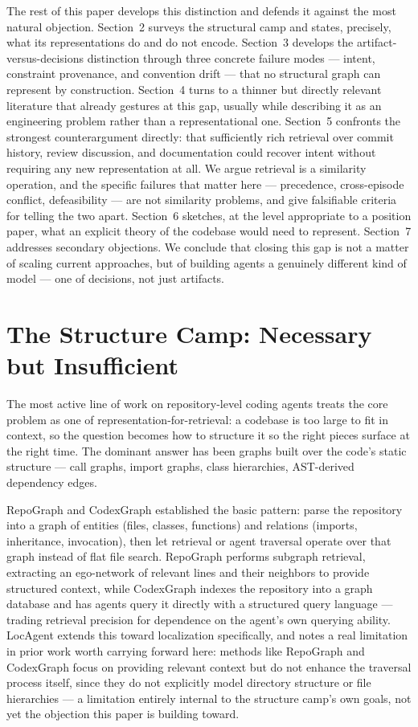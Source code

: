 \documentclass[11pt]{article}
\begin{document}
The rest of this paper develops this distinction and defends it against the most natural objection. Section~2 surveys the structural camp and states, precisely, what its representations do and do not encode. Section~3 develops the artifact-versus-decisions distinction through three concrete failure modes --- intent, constraint provenance, and convention drift --- that no structural graph can represent by construction. Section~4 turns to a thinner but directly relevant literature that already gestures at this gap, usually while describing it as an engineering problem rather than a representational one. Section~5 confronts the strongest counterargument directly: that sufficiently rich retrieval over commit history, review discussion, and documentation could recover intent without requiring any new representation at all. We argue retrieval is a similarity operation, and the specific failures that matter here --- precedence, cross-episode conflict, defeasibility --- are not similarity problems, and give falsifiable criteria for telling the two apart. Section~6 sketches, at the level appropriate to a position paper, what an explicit theory of the codebase would need to represent. Section~7 addresses secondary objections. We conclude that closing this gap is not a matter of scaling current approaches, but of building agents a genuinely different kind of model --- one of decisions, not just artifacts.

\section{The Structure Camp: Necessary but Insufficient}

The most active line of work on repository-level coding agents treats the core problem as one of representation-for-retrieval: a codebase is too large to fit in context, so the question becomes how to structure it so the right pieces surface at the right time. The dominant answer has been graphs built over the code's static structure --- call graphs, import graphs, class hierarchies, AST-derived dependency edges.

RepoGraph and CodexGraph established the basic pattern: parse the repository into a graph of entities (files, classes, functions) and relations (imports, inheritance, invocation), then let retrieval or agent traversal operate over that graph instead of flat file search. RepoGraph performs subgraph retrieval, extracting an ego-network of relevant lines and their neighbors to provide structured context, while CodexGraph indexes the repository into a graph database and has agents query it directly with a structured query language \citep{ouyang2025repograph, liu2024codexgraph} --- trading retrieval precision for dependence on the agent's own querying ability. LocAgent extends this toward localization specifically, and notes a real limitation in prior work worth carrying forward here: methods like RepoGraph and CodexGraph focus on providing relevant context but do not enhance the traversal process itself, since they do not explicitly model directory structure or file hierarchies \citep{locagent2025} --- a limitation entirely internal to the structure camp's own goals, not yet the objection this paper is building toward.
\end{document}
